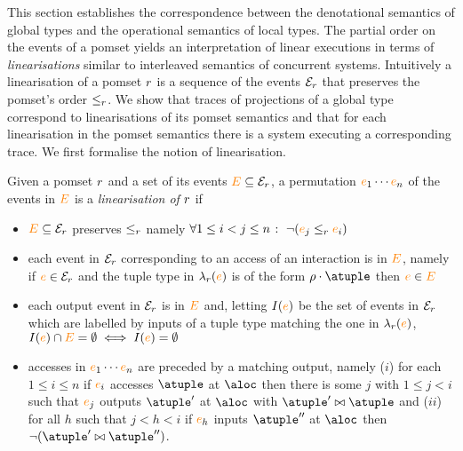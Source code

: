 
This section establishes the correspondence between the denotational
semantics of global types and the operational semantics of local
types.
%
The partial order on the events of a pomset yields an interpretation
of linear executions in terms of \emph{linearisations} similar to
interleaved semantics of concurrent systems.
%
Intuitively a linearisation of a pomset $r$ is a sequence of the
events $\mathcal{E}_{r}$ that preserves the pomset's order
$\leq_{r}$.
%
We show that traces of projections of a global type correspond to
linearisations of its pomset semantics and that for each linearisation
in the pomset semantics there is a system executing a corresponding
trace.
%
We first formalise the notion of linearisation.

Given a pomset $r$ and a set of its events ${\color{orange}{E}} \subseteq \mathcal{E}_{r}$,
a permutation ${\color{orange}{e}}_1 \cdots {\color{orange}{e}}_n$ of the events in ${\color{orange}{E}}$ is a
\emph{linearisation of $r$} if
\begin{itemize}
\item ${\color{orange}{E}} \subseteq \mathcal{E}_{r}$ preserves $\leq_{r}$ namely
  $\forall 1 \leq i < j \leq n \;\colon\; \neg ({\color{orange}{e}}_j \leq_{r} {\color{orange}{e}}_i)$
\item each event in $\mathcal{E}_{r}$ corresponding to an access of an
  interaction is in ${\color{orange}{E}}$, namely
  if ${\color{orange}{e}} \in \mathcal{E}_{r}$ and the tuple type in $\lambda_{r}({\color{orange}{e}})$
  is of the form $\arole \cdot \atuple$ then ${\color{orange}{e}} \in {\color{orange}{E}}$
\item each output event in $\mathcal{E}_{r}$ is in ${\color{orange}{E}}$ and, letting
  $I({\color{orange}{e}})$ be the set of events in $\mathcal{E}_{r}$ which are labelled
  by inputs of a tuple type matching the one in $\lambda_{r}({\color{orange}{e}})$,
  $I({\color{orange}{e}}) \cap {\color{orange}{E}} = \emptyset \iff I({\color{orange}{e}}) = \emptyset$
\item accesses in ${\color{orange}{e}}_1 \cdots {\color{orange}{e}}_n$ are preceded by a matching
  output, namely ($i$) for each $1 \leq i \leq n$ if ${\color{orange}{e}}_i$ accesses
  $\atuple$ at $\aloc$ then there is some $j$ with $1 \leq j < i$ such that ${\color{orange}{e}}_j$
  outputs $\atuple'$ at $\aloc$ with $\atuple' \matches \atuple$ and
  ($ii$) for all $h$ such that $j < h < i$ if ${\color{orange}{e}}_h$ inputs $\atuple''$ at $\aloc$
  then $\neg (\atuple' \matches \atuple'')$.
\end{itemize}

